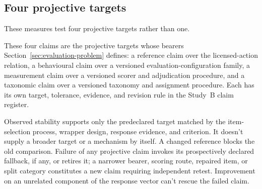 \subsection{Four projective targets}

These measures test four projective targets rather than one.

These four claims are the projective targets whose bearers Section~\ref{sec:evaluation-problem} defines: a reference claim over the licensed-action relation, a behavioural claim over a versioned evaluation-configuration family, a measurement claim over a versioned scorer and adjudication procedure, and a taxonomic claim over a versioned taxonomy and assignment procedure. Each has its own target, tolerance, evidence, and revision rule in the Study~B claim register.

Observed stability supports only the predeclared target matched by the item-selection process, wrapper design, response evidence, and criterion. It doesn't supply a broader target or a mechanism by itself. A changed reference blocks the old comparison. Failure of any projective claim invokes its prospectively declared fallback, if any, or retires it; a narrower bearer, scoring route, repaired item, or split category constitutes a new claim requiring independent retest. Improvement on an unrelated component of the response vector can't rescue the failed claim.
